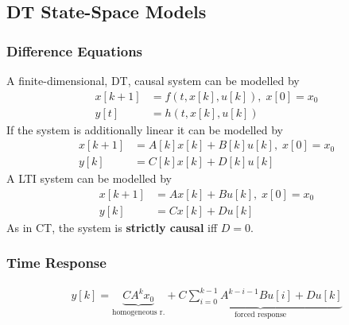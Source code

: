 \subsection{DT State-Space Models}
\subsubsection{Difference Equations}

A finite-dimensional, DT, causal system can be modelled by
\noindent\begin{align*}
    x[k+1] & =f(t,x[k],u[k]), \; x[0]=x_0 \\
    y[t]   & =h(t,x[k],u[k])
\end{align*}
If the system is additionally linear it can be modelled by
\noindent\begin{align*}
    x[k+1] & =A[k]x[k]+B[k]u[k], \; x[0]=x_0 \\
    y[k]   & =C[k]x[k]+D[k]u[k]
\end{align*}
A LTI system can be modelled by
\noindent\begin{align*}
    x[k+1] & =Ax[k]+Bu[k], \; x[0]=x_0 \\
    y[k]   & =Cx[k]+Du[k]
\end{align*}
As in CT, the system is \textbf{strictly causal} iff $D=0$.
\subsubsection{Time Response}
\noindent\begin{align*}
    y[k]=\underbrace{CA^kx_0}_{\text{homogeneous r.}} + \underbrace{C\sum_{i=0}^{k-1}A^{k-i-1}Bu[i]+Du[k]}_{\text{forced response}}
\end{align*}
